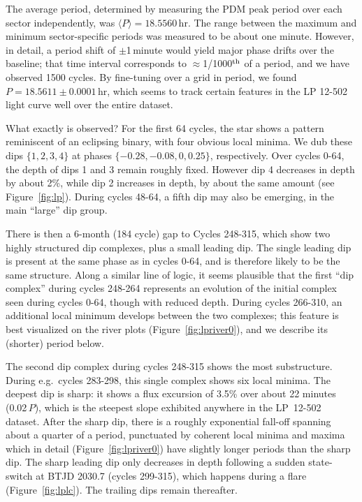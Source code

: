 \documentclass[11pt,twocolumn,tighten]{aastex63}
\begin{document}
The average period, determined by measuring the PDM peak period over
each sector independently, was $\langle P \rangle = 18.5560$\,hr.  The
range between the maximum and minimum sector-specific periods was
measured to be about one minute.   However, in detail, a period shift
of $\pm$1\,minute would yield major phase drifts over the baseline;
that time interval corresponds to $\approx$1/1000$^{\rm th}$ of a
period, and we have observed 1500 cycles.  By fine-tuning over a grid
in period, we found $P=18.5611 \pm 0.0001$\,hr, which seems to track
certain features in the LP 12-502 light curve well over the entire
dataset.

What exactly is observed?  For the first 64 cycles, the star shows a
pattern reminiscent of an eclipsing binary, with four obvious local
minima.  We dub these dips $\{ 1, 2, 3, 4 \}$ at phases $\{ -0.28,
-0.08, 0, 0.25 \}$, respectively.  Over cycles 0-64, the depth of dips
1 and 3 remain roughly fixed.  However dip 4 decreases in depth by
about 2\%, while dip 2 increases in depth, by about the same amount
(see Figure~\ref{fig:lp}).  During cycles 48-64, a fifth dip may also
be emerging, in the main ``large'' dip group.

There is then a 6-month (184 cycle) gap to Cycles 248-315, which show
two highly structured dip complexes, plus a small leading dip.  The
single leading dip is present at the same phase as in cycles 0-64, and
is therefore likely to be the same structure.  Along a similar line of
logic, it seems plausible that the first ``dip complex'' during cycles
248-264 represents an evolution of the initial complex seen during
cycles 0-64, though with reduced depth.  During cycles 266-310, an
additional local minimum develops between the two complexes; this
feature is best visualized on the river plots
(Figure~\ref{fig:lpriver0}), and we describe its (shorter) period
below.

The second dip complex during cycles 248-315 shows the most
substructure.  During e.g.~cycles 283-298, this single complex shows
six local minima.  The deepest dip is sharp: it shows a flux excursion
of 3.5\% over about 22 minutes (0.02\,$P$), which is the steepest
slope exhibited anywhere in the LP~12-502 dataset.  After the sharp
dip, there is a roughly exponential fall-off spanning about a quarter
of a period, punctuated by coherent local minima and maxima which in
detail (Figure~\ref{fig:lpriver0}) have slightly longer periods than
the sharp dip.  The sharp leading dip only decreases in depth
following a sudden state-switch at BTJD 2030.7 (cycles 299-315), which
happens during a flare (Figure~\ref{fig:lplc}).  The trailing dips
remain thereafter.
\end{document}
